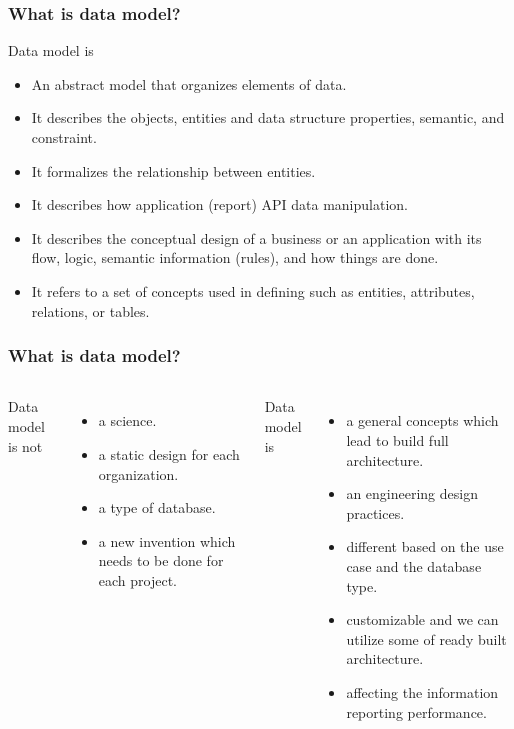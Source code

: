 
\begin{frame}
    \frametitle{What is data model?}
    Data model is
    \begin{itemize}[<+->]
        \item An abstract model that organizes elements of data.
        \item It describes the objects, entities and data structure properties, semantic, and constraint.
        \item It formalizes the relationship between entities.
        \item It describes how application (report) API data manipulation.
        \item It describes the conceptual design of a business or an application with its flow, logic, semantic information (rules), and how things are done.
        \item It refers to a set of concepts used in defining such as entities, attributes, relations, or tables.
    \end{itemize}
\end{frame}

\begin{frame}
    \frametitle{What is data model?}

    \begin{columns}

        Data model is not
        \begin{itemize}[<+->]
            \item a science.
            \item a static design for each organization.
            \item a type of database.
            \item a new invention which needs to be done for each project.
        \end{itemize}


        Data model is
        \begin{itemize}[<+->]
            \item a general concepts which lead to build full architecture.
            \item an engineering design practices.
            \item different based on the use case and the database type.
            \item customizable and we can utilize some of ready built architecture.
            \item affecting the information reporting performance.
        \end{itemize}

    \end{columns}

\end{frame}

